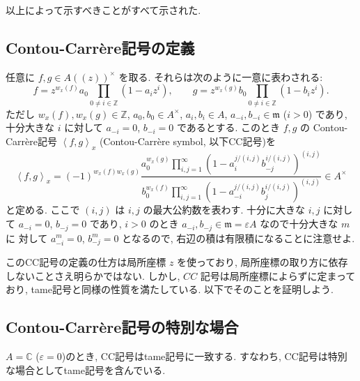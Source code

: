 \documentclass[12pt,twoside]{jarticle}
\newcommand\Z{{\mathbb Z}} %
\newcommand\C{{\mathbb C}} %
\theoremstyle{definition} %
\theoremstyle{definition} %
\theoremstyle{definition} %
\numberwithin{theorem}{section}
\numberwithin{equation}{section}
\numberwithin{figure}{section}
\numberwithin{table}{section}
\newcommand\eps{\varepsilon}
\newcommand\m{{\mathfrak m}}
\newcommand\CC[3]{\left\langle #2,#3\right\rangle_{#1}}
\begin{document}
以上によって示すべきことがすべて示された.


\subsection{Contou-Carr\`ere記号の定義}

任意に $f,g\in A((z))^\times$ を取る.
それらは次のように一意に表わされる:
\[
f = z^{w_x(f)}a_0\prod_{0\ne i\in\Z}(1-a_i z^i), \qquad
g = z^{w_x(g)}b_0\prod_{0\ne i\in\Z}(1-b_i z^i).
\]
ただし $w_x(f),w_x(g)\in\Z$, $a_0,b_0\in A^\times$,
$a_i,b_i\in A$, $a_{-i},b_{-i}\in\m$ ($i>0$) であり,
十分大きな $i$ に対して $a_{-i}=0$, $b_{-i}=0$ であるとする.
このとき $f,g$ の Contou-Carr\`ere記号 $\CC{x}{f}{g}$
(Contou-Carr\`ere symbol, 以下CC記号)を
\[
\CC{x}{f}{g} =
(-1)^{w_x(f)w_x(g)}
\frac
{a_0^{w_x(g)}\prod_{i,j=1}^\infty\left(1-a_i^{j/(i,j)}    b_{-j}^{i/(i,j)}\right)^{(i,j)}}
{b_0^{w_x(f)}\prod_{i,j=1}^\infty\left(1-a_{-i}^{j/(i,j)} b_j^{i/(i,j)}   \right)^{(i,j)}}
\in A^\times
\]
と定める. ここで $(i,j)$ は $i,j$ の最大公約数を表わす.
十分に大きな $i,j$ に対して $a_{-i}=0$, $b_{-j}=0$ であり,
$i>0$ のとき $a_{-i},b_{-j}\in\m=\eps A$ なので十分大きな $m$ に
対して $a_{-i}^m=0$, $b_{-j}^m=0$ となるので,
右辺の積は有限積になることに注意せよ.

このCC記号の定義の仕方は局所座標 $z$ を使っており,
局所座標の取り方に依存しないことさえ明らかではない.
しかし, $CC$ 記号は局所座標によらずに定まっており,
tame記号と同様の性質を満たしている.
以下でそのことを証明しよう.


\subsection{Contou-Carr\`ere記号の特別な場合}

$A=\C$ ($\eps=0$)のとき, CC記号はtame記号に一致する.
すなわち, CC記号は特別な場合としてtame記号を含んでいる.
\end{document}
